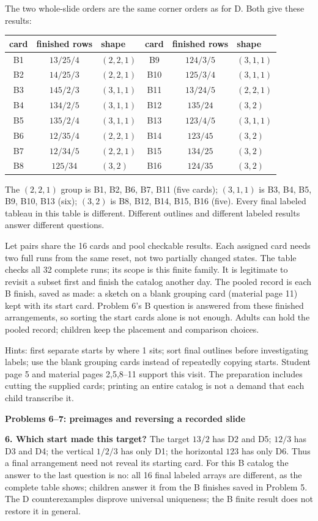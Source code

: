 \documentclass[11pt]{article}
\newcommand{\heading}[1]{\par\textbf{#1}\par}
\begin{document}
The two whole-slide orders are the same corner orders as for D. Both give these results:
\begin{center}\begin{tabular}{ccl@{\qquad}ccl}\toprule
card&finished rows&shape&card&finished rows&shape\\\midrule
B1&$13/25/4$&$(2,2,1)$&B9&$124/3/5$&$(3,1,1)$\\
B2&$14/25/3$&$(2,2,1)$&B10&$125/3/4$&$(3,1,1)$\\
B3&$145/2/3$&$(3,1,1)$&B11&$13/24/5$&$(2,2,1)$\\
B4&$134/2/5$&$(3,1,1)$&B12&$135/24$&$(3,2)$\\
B5&$135/2/4$&$(3,1,1)$&B13&$123/4/5$&$(3,1,1)$\\
B6&$12/35/4$&$(2,2,1)$&B14&$123/45$&$(3,2)$\\
B7&$12/34/5$&$(2,2,1)$&B15&$134/25$&$(3,2)$\\
B8&$125/34$&$(3,2)$&B16&$124/35$&$(3,2)$\\
\bottomrule\end{tabular}\end{center}
The $(2,2,1)$ group is B1, B2, B6, B7, B11 (five cards); $(3,1,1)$ is B3, B4, B5, B9, B10, B13 (six); $(3,2)$ is B8, B12, B14, B15, B16 (five). Every final labeled tableau in this table is different. Different outlines and different labeled results answer different questions.

Let pairs share the 16 cards and pool checkable results. Each assigned card needs two full runs from the same reset, not two partially changed states. The table checks all 32 complete runs; its scope is this finite family. It is legitimate to revisit a subset first and finish the catalog another day. The pooled record is each B finish, saved as made: a sketch on a blank grouping card (material page 11) kept with its start card. Problem 6's B question is answered from these finished arrangements, so sorting the start cards alone is not enough. Adults can hold the pooled record; children keep the placement and comparison choices.

Hints: first separate starts by where 1 sits; sort final outlines before investigating labels; use the blank grouping cards instead of repeatedly copying starts. Student page 5 and material pages 2,5,8--11 support this visit. The preparation includes cutting the supplied cards; printing an entire catalog is not a demand that each child transcribe it.
\newpage
\heading{Problems 6--7: preimages and reversing a recorded slide}
\textbf{6. Which start made this target?} The target $13/2$ has D2 and D5; $12/3$ has D3 and D4; the vertical $1/2/3$ has only D1; the horizontal $123$ has only D6. Thus a final arrangement need not reveal its starting card. For this B catalog the answer to the last question is no: all 16 final labeled arrays are different, as the complete table shows; children answer it from the B finishes saved in Problem 5. The D counterexamples disprove universal uniqueness; the B finite result does not restore it in general.
\end{document}
